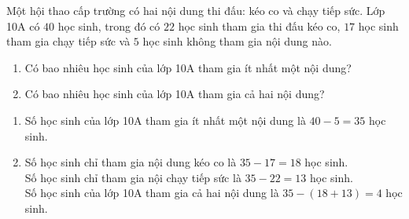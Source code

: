 \begin{ex}%
Một hội thao cấp trường có hai nội dung thi đấu: kéo co và chạy tiếp sức. Lớp 10A có $40$ học sinh, trong đó có $22$ học sinh tham gia thi đấu kéo co, $17$ học sinh tham gia chạy tiếp sức và $5$ học sinh không tham gia nội dung nào.
\begin{enumerate}
\item Có bao nhiêu học sinh của lớp 10A tham gia ít nhất một nội dung?
\item Có bao nhiêu học sinh của lớp 10A tham gia cả hai nội dung?
\end{enumerate}
\loigiai
{
\begin{enumerate}
\item Số học sinh của lớp 10A tham gia ít nhất một nội dung là $40-5=35$ học sinh.
\item Số học sinh chỉ tham gia nội dung kéo co là $35-17=18$ học sinh.\\
Số học sinh chỉ tham gia nội chạy tiếp sức là $35-22=13$ học sinh.\\
Số học sinh của lớp 10A tham gia cả hai nội dung là $35-(18+13)=4$ học sinh.
\end{enumerate}
}
\end{ex}
